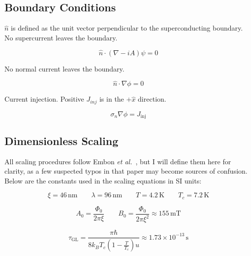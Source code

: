 \documentclass[11pt]{article}
\theoremstyle{definition}
\begin{document}
\subsection{Boundary Conditions}
\label{sec:bc}

$\hat{n}$ is defined as the unit vector perpendicular to the superconducting boundary.
No supercurrent leaves the boundary.

\begin{equation}
\label{eq:bc-super}
\hat{n} \cdot (\nabla - i A) \psi = 0
\end{equation}

No normal current leaves the boundary.

\begin{equation}
\label{eq:bc-normal}
\hat{n} \cdot \nabla \phi = 0
\end{equation}

Current injection. Positive $J_{inj}$ is in the $+\hat{x}$ direction.

\begin{equation}
\label{eq:bc-inject}
\sigma_n \nabla \phi = J_{\mathrm{inj}}
\end{equation}

\subsection{Dimensionless Scaling}
\label{sec:scaling}

All scaling procedures follow Embon \textit{et al.}~\cite{embon2017}, but I will define them here for clarity, as a few suspected typos in that paper may become sources of confusion.
Below are the constants used in the scaling equations in SI units:

\begin{equation}
\label{eq:scale-constants}
\xi = 46\,\text{nm} \qquad \lambda = 96\,\text{nm} \qquad T = 4.2\,\text{K} \qquad T_c = 7.2\,\text{K}
\end{equation}

\begin{equation}
\label{eq:scale-AB}
A_0 = \frac{\Phi_0}{2 \pi \xi} \qquad B_0 = \frac{\Phi_0}{2 \pi \xi^2} \approx 155\,\text{mT}
\end{equation}

\begin{equation}
\label{eq:scale-tau}
\tau_{\mathrm{GL}} = \frac{\pi \hbar}{8 k_B T_c \left( 1 - \frac{T}{T_c} \right) u} \approx 1.73 \times 10^{-13}\,\text{s}
\end{equation}
\end{document}
